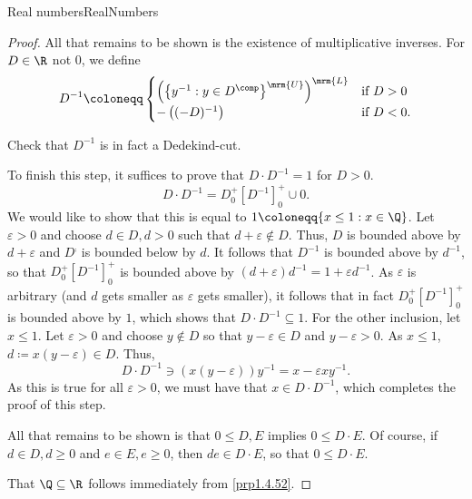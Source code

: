 \begin{thm}{Real numbers}{RealNumbers}
\begin{proof}
All that remains to be shown is the existence of multiplicative inverses.  For $D\in \R$ not $0$, we define
\begin{equation}
D^{-1}\coloneqq \begin{cases}\left( \left\{ y^{-1}:y\in D^{\comp}\right\} ^{\mrm{U}}\right) ^{\mrm{L}}& \text{if }D>0 \\ -\left( (-D)^{-1}\right) & \text{if }D<0.\end{cases}
\end{equation}
\begin{exr}[breakable=false]{}{}
Check that $D^{-1}$ is in fact a Dedekind-cut.
\end{exr}

To finish this step, it suffices to prove that $D\cdot D^{-1}=1$ for $D>0$.
\begin{equation}
D\cdot D^{-1}=D_0^+[D^{-1}]_0^+\cup 0.
\end{equation}
We would like to show that this is equal to $1\coloneqq \{ x\leq 1:x\in \Q \}$.  Let $\varepsilon >0$ and choose $d\in D,d>0$ such that $d+\varepsilon \notin D$.  Thus, $D$ is bounded above by $d+\varepsilon$ and $D^{\comp}$ is bounded below by $d$.  It follows that $D^{-1}$ is bounded above by $d^{-1}$, so that $D_0^+[D^{-1}]_0^+$ is bounded above by $(d+\varepsilon )d^{-1}=1+\varepsilon d^{-1}$.  As $\varepsilon$ is arbitrary (and $d$ gets smaller as $\varepsilon$ gets smaller), it follows that in fact $D_0^+[D^{-1}]_0^+$ is bounded above by $1$, which shows that $D\cdot D^{-1}\subseteq 1$.  For the other inclusion, let $x\leq 1$.  Let $\varepsilon >0$ and choose $y\notin D$ so that $y-\varepsilon \in D$ and $y-\varepsilon >0$.  As $x\leq 1$, $d\coloneqq x(y-\varepsilon )\in D$.  Thus,
\begin{equation}
D\cdot D^{-1}\ni \left( x(y-\varepsilon )\right) y^{-1}=x-\varepsilon xy^{-1}.
\end{equation}
As this is true for all $\varepsilon >0$, we must have that $x\in D\cdot D^{-1}$, which completes the proof of this step.

All that remains to be shown is that $0\leq D,E$ implies $0\leq D\cdot E$.  Of course, if $d\in D,d\geq 0$ and $e\in E,e\geq 0$, then $de\in D\cdot E$, so that $0\leq D\cdot E$.

That $\Q \subseteq \R$ follows immediately from \cref{prp1.4.52}.


\end{proof}
\end{thm}
